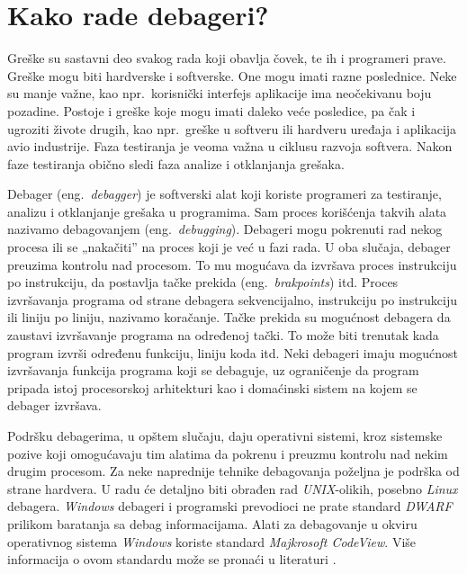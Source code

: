 \documentclass[12pt,oneside]{memoir}
\begin{document}

\chapter{Kako rade debageri?}
\label{chp:debageri}

Greške su sastavni deo svakog rada koji obavlja čovek, te ih i programeri prave. Greške mogu biti hardverske i softverske. One mogu imati razne poslednice. Neke su manje važne, kao npr.~korisnički interfejs aplikacije ima neočekivanu boju pozadine. Postoje i greške koje mogu imati daleko veće posledice, pa čak i ugroziti živote drugih, kao npr.~greške u softveru ili hardveru uređaja i aplikacija avio industrije. Faza testiranja je veoma važna u ciklusu razvoja softvera. Nakon faze testiranja obično sledi faza analize i otklanjanja grešaka.

Debager (eng.~\emph{debagger}) je softverski alat koji koriste programeri za testiranje, analizu i otklanjanje grešaka u programima. Sam proces korišćenja takvih alata nazivamo debagovanjem (eng.~\emph{debugging}).
Debageri mogu pokrenuti rad nekog procesa ili se „nakačiti” na proces koji je već u fazi rada. U oba slučaja, debager preuzima kontrolu nad procesom. To mu mogućava da izvršava proces instrukciju po instrukciju, da postavlja tačke prekida (eng.~\emph{brakpoints}) itd. Proces izvršavanja programa od strane debagera sekvencijalno, instrukciju po instrukciju ili liniju po liniju, nazivamo koračanje. Tačke prekida su mogućnost debagera da zaustavi izvršavanje programa na određenoj tački. To može biti trenutak kada program izvrši određenu funkciju, liniju koda itd. Neki debageri imaju mogućnost izvršavanja funkcija programa koji se debaguje, uz ograničenje da program pripada istoj procesorskoj arhitekturi kao i domaćinski sistem na kojem se debager izvršava.

Podršku debagerima, u opštem slučaju, daju operativni sistemi, kroz sistemske pozive koji omogućavaju tim alatima da pokrenu i preuzmu kontrolu nad nekim drugim procesom. Za neke naprednije tehnike debagovanja poželjna je podrška od strane hardvera. U radu će detaljno biti obrađen rad \emph{UNIX}-olikih, posebno \emph{Linux} debagera. \emph{Windows} debageri i programski prevodioci ne prate standard \emph{DWARF} \cite{DWARF} prilikom baratanja sa debag informacijama. Alati za debagovanje u okviru operativnog sistema \emph{Windows} koriste standard \emph{Majkrosoft CodeView}.  Više informacija o ovom standardu može se pronaći u literaturi \cite{CodeView}.
\end{document}
